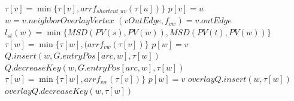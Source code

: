 \begin{algorithm}
{\begin{minipage}{\textwidth}
\begin{algorithmic}[1]
       
            \State $\tau[v]=\min\{\tau[v],arr f_{shortcut\_uv}(\tau[u])\}$  
            \State $p[v]=u$     
            \State $w=v.neighborOverlayVertex$
            \State $(vOutEdge,f_{vw})=v.outEdge$
            \State $l_{st}(w)=\min\{MSD(PV(s), PV(w)), MSD(PV(t), PV(w))\}$
             
                    \State $\tau[w]=\min\{\tau[w],(arr f_{vw}(\tau[v])\}$  
                    \State $p[w]=v$     
                        \State $Q.insert(w,G.entryPos[arc,w],\tau[w])$
                    \Else
                     \State   $Q.decreaseKey(w,G.entryPos[arc,w],\tau[w])$
                    \EndIf
                \EndIf
            \Else
                    \State $\tau[w]=\min\{\tau[w],arr f_{vw}(\tau[v])\}$  
                    \State $p[w]=v$    
                        \State $overlayQ.insert(w,\tau[w])$
                    \Else
                      \State  $overlayQ.decreaseKey(w,\tau[w])$
                    \EndIf
                \EndIf          
            \EndIf
                
            
        \EndIf
       
    \EndProcedure
\end{algorithmic}
\end{minipage}%
}
\end{algorithm}


